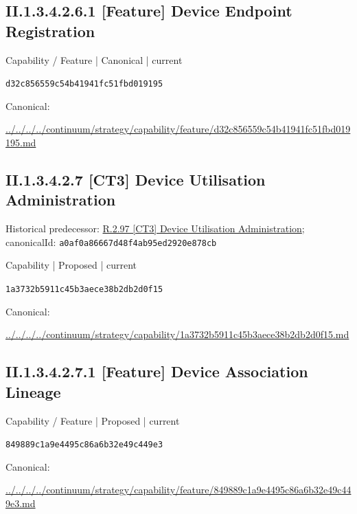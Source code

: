 \documentclass[10pt,a4paper]{article}
\begin{document}
\subsection*{II.1.3.4.2.6.1 [Feature] Device Endpoint Registration}
\label{element-d32c856559c54b41941fc51fbd019195}
{\small Capability / Feature | Canonical | current}\par
\texttt{d32c856559c54b41941fc51fbd019195}\par
Canonical: \par
{\footnotesize\url{../../../../continuum/strategy/capability/feature/d32c856559c54b41941fc51fbd019195.md}}\par
\subsection*{II.1.3.4.2.7 [CT3] Device Utilisation Administration}
Historical predecessor: \hyperref[element-a0af0a86667d48f4ab95ed2920e878cb]{R.2.97 [CT3] Device Utilisation Administration}; canonicalId: \texttt{a0af0a86667d48f4ab95ed2920e878cb}\par
\label{element-1a3732b5911c45b3aece38b2db2d0f15}
{\small Capability | Proposed | current}\par
\texttt{1a3732b5911c45b3aece38b2db2d0f15}\par
Canonical: \par
{\footnotesize\url{../../../../continuum/strategy/capability/1a3732b5911c45b3aece38b2db2d0f15.md}}\par
\subsection*{II.1.3.4.2.7.1 [Feature] Device Association Lineage}
\label{element-849889c1a9e4495c86a6b32e49c449e3}
{\small Capability / Feature | Proposed | current}\par
\texttt{849889c1a9e4495c86a6b32e49c449e3}\par
Canonical: \par
{\footnotesize\url{../../../../continuum/strategy/capability/feature/849889c1a9e4495c86a6b32e49c449e3.md}}\par
\end{document}
